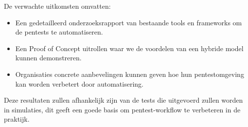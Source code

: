 De verwachte uitkomsten omvatten:
\begin{itemize}
    \item Een gedetailleerd onderzoeksrapport van bestaande tools en frameworks om de pentests te automatiseren.
    \item Een Proof of Concept uitrollen waar we de voordelen van een hybride model kunnen demonstreren.
    \item Organisaties concrete aanbevelingen kunnen geven hoe hun pentestomgeving kan worden verbetert door automatisering.
\end{itemize}

Deze resultaten zullen afhankelijk zijn van de tests die uitgevoerd zullen worden in simulaties, dit geeft een goede basis om 
pentest-workflow te verbeteren in de praktijk.